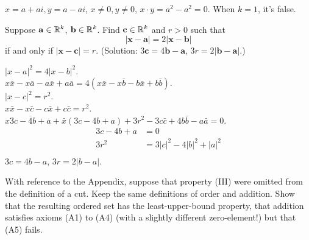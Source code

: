 \mySolve
$x = a+ai, y = a-ai$, $x \neq 0, y \neq 0$, $x\cdot y = a^2-a^2=0$.
When $k=1$, it's false.


\begin{myexercise}
    \label{ex:1.19}
    Suppose $\mathbf{a} \in {\protect\mathbb R}^k$, $\mathbf{b} \in{\protect\mathbb R}^k$. Find $\mathbf{c} \in {\protect\mathbb R}^k$ and $r > 0$ such that
    \begin{equation*}
        |\mathbf{x} - \mathbf{a}| = 2|\mathbf{x} - \mathbf{b}|
    \end{equation*}
    if and only if $|\mathbf{x} - \mathbf{c}| = r$.
    (Solution: $3\mathbf{c} =4\mathbf{b}-\mathbf{a}$, $3r =2|\mathbf{b}-\mathbf{a}|$.)
\end{myexercise}

\mySolve
$|x-a|^2 = 4|x-b|^2$.\\
$x\bar{x} - x\bar{a} - a\bar{x} + a\bar{a} = 4(x\bar{x} - x\bar{b} - b\bar{x} + b\bar{b})$.\\
$|x-c|^2 = r^2$.\\
$x\bar{x} - x\bar{c} - c\bar{x} + c\bar{c} = r^2$.\\
$x\overline{3c-4b+a}+\bar{x}(3c-4b+a)+3r^2-3c\bar{c}+4b\bar{b}-a\bar{a} = 0$.
\begin{align*}
    3c-4b+a&=0\\
    3r^2 &= 3|c|^2 - 4|b|^2 + |a|^2 \\
\end{align*}
$3c = 4b-a$, $3r = 2|b-a|$.


\begin{myexercise}
    \label{ex:1.20}
    With reference to the Appendix, suppose that property (III) were omitted from the
    definition of a cut. Keep the same definitions of order and addition. Show that
    the resulting ordered set has the least-upper-bound property, that addition satisfies
    axioms (A1) to (A4) (with a slightly different zero-element!) but that (A5) fails.
\end{myexercise}

\mySolve


